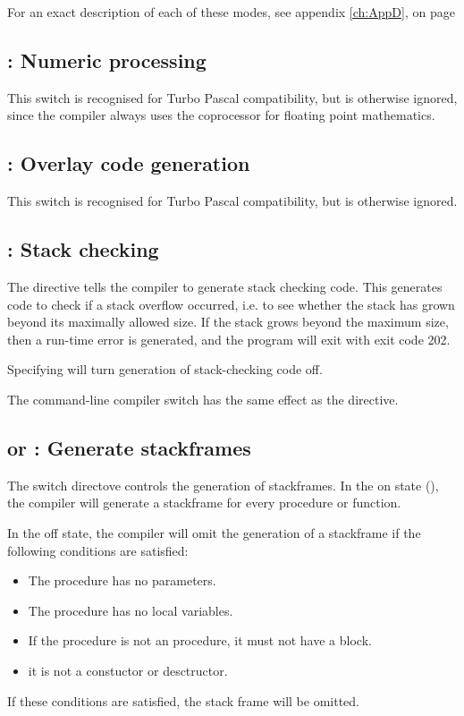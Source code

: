\documentclass{report}
\begin{document}
For an exact description of each of these modes, see appendix \ref{ch:AppD}, 
on page \pageref{ch:AppD}

\subsection{ : Numeric processing }

This switch is recognised for Turbo Pascal compatibility, but is otherwise
ignored, since the compiler always uses the coprocessor for floating point
mathematics.

\subsection{ : Overlay code generation }

This switch is recognised for Turbo Pascal compatibility, but is otherwise
ignored.

\subsection{ : Stack checking}
The  directive tells the compiler to generate stack checking
code. This generates code to check if a stack overflow occurred, i.e. to see
whether the stack has grown beyond its maximally allowed size. If the stack
grows beyond the maximum size, then a run-time error is generated, and the
program will exit with exit code 202.

Specifying  will turn generation of stack-checking code off.

The command-line compiler switch  has the same effect as the
 directive.


\subsection{ or  : Generate stackframes}

The  switch directove controls the generation of stackframes.
In the on state (), the compiler will generate a
stackframe for every procedure or function.

In the off state, the compiler will omit the generation of a stackframe if
the following conditions are satisfied:
\begin{itemize}
\item The procedure has no parameters.
\item The procedure has no local variables.
\item If the procedure is not an  procedure, it must not have
a  block.
\item it is not a constuctor or desctructor.
\end{itemize}
If these conditions are satisfied, the stack frame will be omitted.
\end{document}
